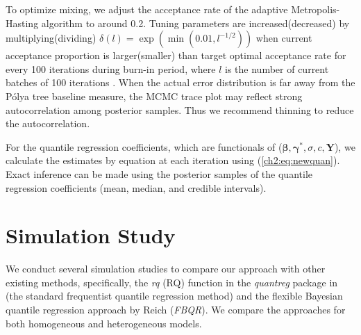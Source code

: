 \documentclass[12pt]{article}
\newcommand{\polya}{P\'{o}lya}
\begin{document}
To optimize mixing, we adjust the acceptance rate of the adaptive
Metropolis-Hasting algorithm to around 0.2.  Tuning parameters are
increased(decreased) by multiplying(dividing) $\delta(l) =
\exp(\min(0.01, l^{-1/2}))$ when current acceptance proportion is
larger(smaller) than target optimal acceptance rate for every 100
iterations during burn-in period, where $l$ is the number of current
batches of 100 iterations \citep{jara2009}. When the actual error
distribution is far away from the \polya{} tree baseline measure, the
MCMC trace plot may reflect strong autocorrelation among posterior
samples. Thus we recommend thinning to reduce the autocorrelation.

For the quantile regression coefficients, which are functionals of
($\bm \beta, \bm \gamma^{*}, \sigma, c, \bm Y$), we calculate the
estimates by equation at each iteration using
(\ref{ch2:eq:newquan}). Exact inference can be made using the posterior
samples of the quantile regression coefficients (mean, median, and
credible intervals).

\section{Simulation Study}
\label{ch2:sec:simulations}
We conduct several simulation studies to compare our approach with
other existing methods, specifically, the \textit{rq} (RQ) function in the
\textit{quantreg} package \citep{quantreg} in \cite{R} (the standard
frequentist quantile regression method) and the flexible Bayesian
quantile regression approach by Reich (\textit{FBQR}).  We compare the
approaches for both homogeneous and heterogeneous models.
\end{document}
